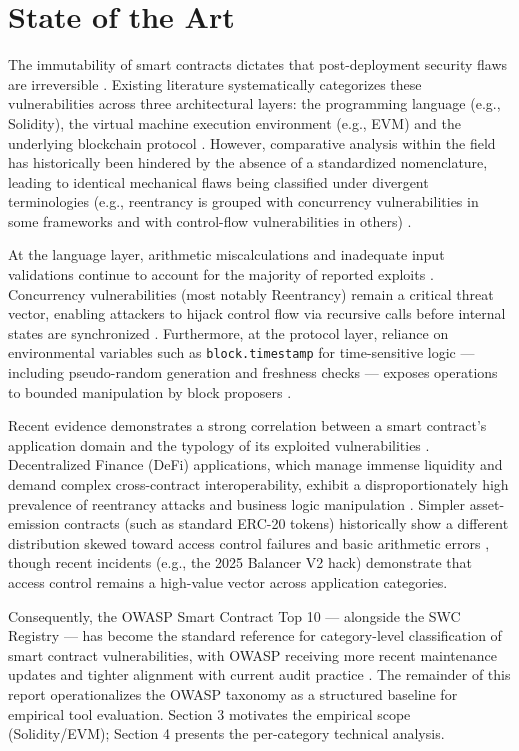\section{State of the Art}

The immutability of smart contracts dictates that post-deployment security flaws are irreversible \cite{acm_lifecycle_2025}. Existing literature systematically categorizes these vulnerabilities across three architectural layers: the programming language (e.g., Solidity), the virtual machine execution environment (e.g., EVM) and the underlying blockchain protocol \cite{mdpi_state_2022, ieee_systematic_2021}. However, comparative analysis within the field has historically been hindered by the absence of a standardized nomenclature, leading to identical mechanical flaws being classified under divergent terminologies (e.g., reentrancy is grouped with concurrency vulnerabilities in some frameworks and with control-flow vulnerabilities in others) \cite{mdpi_state_2022}.

At the language layer, arithmetic miscalculations and inadequate input validations continue to account for the majority of reported exploits \cite{acm_attacks_detection_2024}. Concurrency vulnerabilities (most notably Reentrancy) remain a critical threat vector, enabling attackers to hijack control flow via recursive calls before internal states are synchronized \cite{owasp_top10, acm_attacks_detection_2024}. Furthermore, at the protocol layer, reliance on environmental variables such as \texttt{block.timestamp} for time-sensitive logic — including pseudo-random generation and freshness checks — exposes operations to bounded manipulation by block proposers \cite{ieee_cryptographic_2024}.

Recent evidence demonstrates a strong correlation between a smart contract's application domain and the typology of its exploited vulnerabilities \cite{nature_taxonomic_2024}. Decentralized Finance (DeFi) applications, which manage immense liquidity and demand complex cross-contract interoperability, exhibit a disproportionately high prevalence of reentrancy attacks and business logic manipulation \cite{sciencedirect_defi_2025}. Simpler asset-emission contracts (such as standard ERC-20 tokens) historically show a different distribution skewed toward access control failures and basic arithmetic errors \cite{nature_taxonomic_2024}, though recent incidents (e.g., the 2025 Balancer V2 hack) demonstrate that access control remains a high-value vector across application categories.

Consequently, the OWASP Smart Contract Top 10 — alongside the SWC Registry — has become the standard reference for category-level classification of smart contract vulnerabilities, with OWASP receiving more recent maintenance updates and tighter alignment with current audit practice \cite{owasp_top10}. The remainder of this report operationalizes the OWASP taxonomy as a structured baseline for empirical tool evaluation. Section 3 motivates the empirical scope (Solidity/EVM); Section 4 presents the per-category technical analysis.